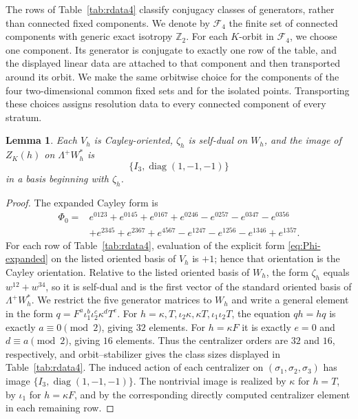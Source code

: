 \documentclass[11pt]{article}
\newtheorem{lemma}[theorem]{Lemma}
\theoremstyle{remark}\newtheorem{remark}[theorem]{Remark}
\newcommand{\Z}{\mathbb Z}
\newcommand{\diag}{\operatorname{diag}}
\begin{document}
The rows of Table~\ref{tab:rdata4} classify conjugacy classes of
generators, rather than connected fixed components.  We denote by
$\mathcal F_4$ the finite set of connected components with generic exact isotropy
$\Z_2$.  For each $K$-orbit in $\mathcal F_4$, we choose one component.  Its
generator is conjugate to exactly one row of the table, and the displayed
linear data are attached to that component and then transported around its
orbit.  We make the same orbitwise choice for the components of the four
two-dimensional common fixed sets and for the isolated points.  Transporting
these choices assigns resolution data to every connected component of every
stratum.

\begin{lemma}\label{lem:four-rdata}
Each $V_h$ is Cayley-oriented, $\zeta_h$ is self-dual on $W_h$, and the
image of $Z_K(h)$ on $\Lambda^+W_h^*$ is
\begin{equation}\label{eq:centralizer-image}
\{I_3,\diag(1,-1,-1)\}
\end{equation}
in a basis beginning with $\zeta_h$.
\end{lemma}
\begin{proof}
The expanded Cayley form is
\begin{align}\label{eq:Phi-expanded}
\Phi_0={}&e^{0123}+e^{0145}+e^{0167}+e^{0246}-e^{0257}-e^{0347}-e^{0356}\\
&+e^{2345}+e^{2367}+e^{4567}-e^{1247}-e^{1256}-e^{1346}+e^{1357}.\nonumber
\end{align}
For each row of Table~\ref{tab:rdata4}, evaluation of the explicit form
\eqref{eq:Phi-expanded} on the listed oriented basis of $V_h$ is $+1$;
hence that orientation is the Cayley orientation.  Relative to the listed
oriented basis of $W_h$, the form $\zeta_h$ equals $w^{12}+w^{34}$, so it
is self-dual and is the first vector of the standard oriented basis of
$\Lambda^+W_h^*$.  We restrict the five generator matrices to $W_h$ and
write a general element in the form
$q=F^a\iota_1^b\iota_2^c\kappa^dT^e$.  For
$h=\kappa,T,\iota_2\kappa,\kappa T,\iota_1\iota_2T$, the equation
$qh=hq$ is exactly $a\equiv0\pmod2$, giving $32$ elements.  For
$h=\kappa F$ it is exactly
$e=0$ and $d\equiv a\pmod2$, giving $16$ elements.  Thus the centralizer
orders are $32$ and $16$, respectively, and orbit--stabilizer gives the
class sizes displayed in Table~\ref{tab:rdata4}.  The induced action of
each centralizer on $(\sigma_1,\sigma_2,\sigma_3)$ has image
$\{I_3,\diag(1,-1,-1)\}$.  The nontrivial image is realized by $\kappa$
for $h=T$, by $\iota_1$ for $h=\kappa F$, and by the corresponding
directly computed centralizer element in each remaining row.
\end{proof}
\end{document}
